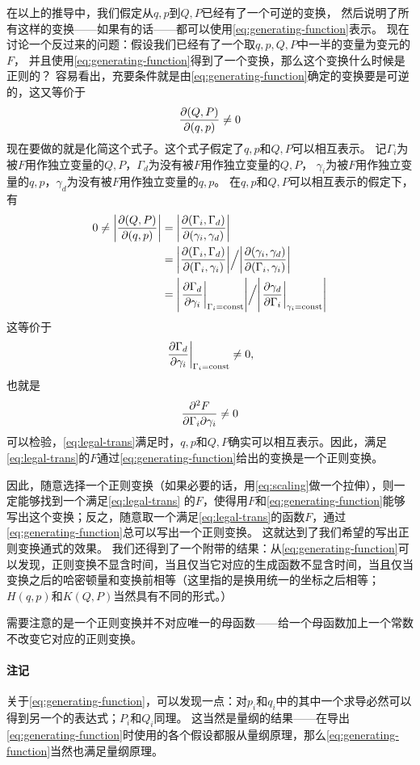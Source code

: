\documentclass[UTF8, a4paper]{ctexart}
\newcommand*{\const}{\mathrm{const}}
\newcommand*{\comment}{\paragraph{注记}}
\begin{document}
在以上的推导中，我们假定从$q, p$到$Q, P$已经有了一个可逆的变换，
然后说明了所有这样的变换——如果有的话——都可以使用\eqref{eq:generating-function}表示。
现在讨论一个反过来的问题：假设我们已经有了一个取$q, p, Q, P$中一半的变量为变元的$F$，
并且使用\eqref{eq:generating-function}得到了一个变换，那么这个变换什么时候是正则的？
容易看出，充要条件就是由\eqref{eq:generating-function}确定的变换要是可逆的，这又等价于
\[
    \pdv{(Q, P)}{(q, p)} \neq 0
\]
现在要做的就是化简这个式子。这个式子假定了$q, p$和$Q, P$可以相互表示。
记$\Gamma_{i}$为被$F$用作独立变量的$Q, P$，$\Gamma_{d}$为没有被$F$用作独立变量的$Q, P$，
$\gamma_{i}$为被$F$用作独立变量的$q, p$，$\gamma_{d}$为没有被$F$用作独立变量的$q, p$。
在$q, p$和$Q, P$可以相互表示的假定下，有
\[
    \begin{aligned}
        0 \neq \abs{\pdv{(Q, P)}{(q, p)}} &= \abs{\pdv{(\Gamma_i, \Gamma_d)}{(\gamma_i, \gamma_d)}} \\
        &= \abs{\pdv{(\Gamma_i, \Gamma_d)}{(\Gamma_i, \gamma_i)}} \Big/ \abs{\pdv{(\gamma_i, \gamma_d)}{(\Gamma_i, \gamma_i)}} \\
        &= \abs{\eval{\pdv{\Gamma_d}{\gamma_i}}_{\Gamma_i=\const}} \Big/ \abs{\eval{\pdv{\gamma_d}{\Gamma_i}}_{\gamma_i=\const}}
    \end{aligned}
\]
这等价于
\[
    \eval{\pdv{\Gamma_d}{\gamma_i}}_{\Gamma_i=\const} \neq 0,
\]
也就是
\begin{equation}
    \pdv{F}{\Gamma_i}{\gamma_i} \neq 0
    \label{eq:legal-trans}
\end{equation}
可以检验，\eqref{eq:legal-trans}满足时，$q, p$和$Q,P$确实可以相互表示。因此，满足\eqref{eq:legal-trans}的$F$通过\eqref{eq:generating-function}给出的变换是一个正则变换。

因此，随意选择一个正则变换（如果必要的话，用\eqref{eq:scaling}做一个拉伸），则一定能够找到一个满足\eqref{eq:legal-trans}
的$F$，使得用$F$和\eqref{eq:generating-function}能够写出这个变换；反之，随意取一个满足\eqref{eq:legal-trans}的函数$F$，通过\eqref{eq:generating-function}总可以写出一个正则变换。
这就达到了我们希望的写出正则变换通式的效果。
我们还得到了一个附带的结果：从\eqref{eq:generating-function}可以发现，正则变换不显含时间，当且仅当它对应的生成函数不显含时间，当且仅当变换之后的哈密顿量和变换前相等（这里指的是换用统一的坐标之后相等；$H(q, p)$和$K(Q,P)$当然具有不同的形式。）

需要注意的是一个正则变换并不对应唯一的母函数——给一个母函数加上一个常数不改变它对应的正则变换。

\comment 关于\eqref{eq:generating-function}，可以发现一点：对$p_i$和$q_i$中的其中一个求导必然可以得到另一个的表达式；$P_i$和$Q_i$同理。
这当然是量纲的结果——在导出\eqref{eq:generating-function}时使用的各个假设都服从量纲原理，那么\eqref{eq:generating-function}当然也满足量纲原理。
\end{document}
